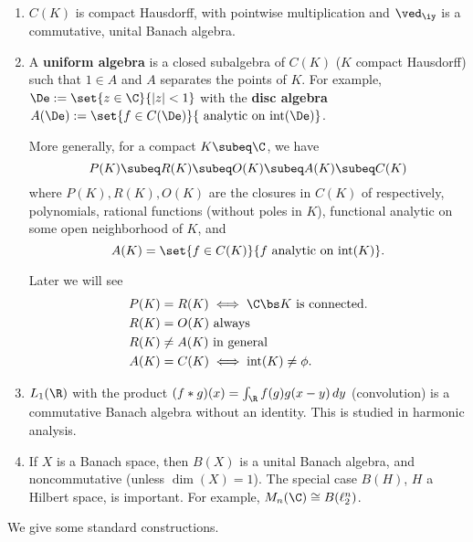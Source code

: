 \begin{ex}
\begin{enumerate}
\item
$C(K)$ is compact Hausdorff, with pointwise multiplication and $\ved_{\iy}$ is a commutative, unital Banach algebra.
\item
{}
A \textbf{uniform algebra} is a closed subalgebra of $C(K)$ ($K$ compact Hausdorff) such that $1\in A$ and $A$ separates the points of $K$. For example, $\De:=\set{z\in \C}{|z|<1}$ with the \textbf{disc algebra} $A(\De):=\set{f\in C(\De)}{\text{ analytic on }\text{int}(\De)}$. 

More generally, for a compact $K\subeq \C$, we have
\[
P(K)\subeq %
R(K)\subeq %
O(K)\subeq A(K)\subeq C(K)
\]
where $P(K), R(K), O(K)$ are the closures in $C(K)$ of respectively, polynomials, rational functions (without poles in $K$), functional analytic on some open neighborhood of $K$, and 
\[
A(K)=\set{f\in C(K)}{f\text{ analytic on }\text{int}(K)}.
\]

Later we will see
\begin{align*}
P(K)&=R(K)\iff \C\bs K\text{ is connected.}\\
R(K)&=O(K)\text{ always}\\
R(K)&\ne A(K)\text{ in general}\\
A(K)&=C(K) \iff \text{int}(K)\ne \phi.
\end{align*}
\item
$L_1(\R)$ with the product $(f*g)(x)=\int_{\R}f(g)g(x-y)\,dy$ (convolution) is a commutative Banach algebra without an identity. This is studied in harmonic analysis.
\item
If $X$ is a Banach space, then $B(X)$ is a unital Banach algebra, and noncommutative (unless $\dim(X)=1$). The special case $B(H)$, $H$ a Hilbert space, is important. For example, $M_n(\C)\cong B(\ell_2^n)$.
\end{enumerate}
\end{ex}
We give some standard constructions.

